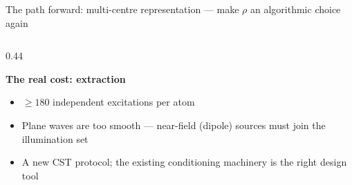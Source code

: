 \documentclass[10pt,aspectratio=169]{beamer}
\begin{document}
\begin{frame}{The path forward: multi-centre representation --- make $\rho$ an algorithmic choice again}
\begin{columns}[t]
\begin{column}{0.44\textwidth}
\begin{itemize}
      \end{itemize}
      \vspace{1ex}
      {\textcolor{bad}{\textbf{The real cost: extraction}}}
      \begin{itemize}\footnotesize
        \item $\ge 180$ independent excitations per atom
        \item Plane waves are too smooth --- near-field (dipole) sources must join the illumination set
        \item A new CST protocol; the existing conditioning machinery is the right design tool
      \end{itemize}
    \end{column}
  \end{columns}
\end{frame}
\end{document}
